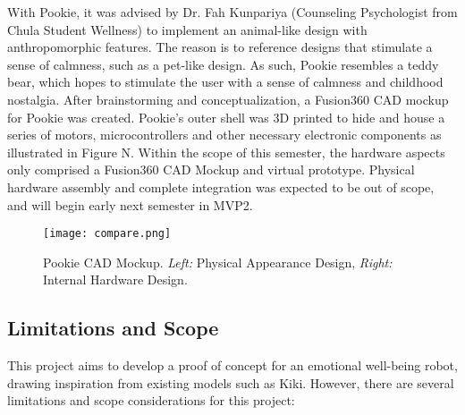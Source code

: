 With Pookie, it was advised by Dr. Fah Kunpariya (Counseling Psychologist from Chula Student Wellness) to implement an animal-like design with anthropomorphic features. The reason is to reference designs that stimulate a sense of calmness, such as a pet-like design. As such, Pookie resembles a teddy bear, which hopes to stimulate the user with a sense of calmness and childhood nostalgia. After brainstorming and conceptualization, a Fusion360 CAD mockup for Pookie was created. Pookie’s outer shell was 3D printed to hide and house a series of motors, microcontrollers and other necessary electronic components as illustrated in Figure N. Within the scope of this semester, the hardware aspects only comprised a Fusion360 CAD Mockup and virtual prototype. Physical hardware assembly and complete integration was expected to be out of scope, and will begin early next semester in MVP2.

\begin{figure}[!htb]
    \centering
    \texttt{[image: compare.png]}
    \caption{Pookie CAD Mockup. \textit{Left:} Physical Appearance Design, \textit{Right:} Internal Hardware Design.}
    \label{fig:comparison}
\end{figure}

\subsection{Limitations and Scope}

This project aims to develop a proof of concept for an emotional well-being robot, drawing inspiration from existing models such as Kiki. However, there are several limitations and scope considerations for this project:

